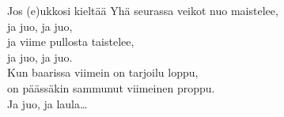 \begin{song}{Jos (e)ukkosi kieltää}
    \showversenumber
	Yhä seurassa veikot nuo maistelee,\\
	ja juo, ja juo,\\
	ja viime pullosta taistelee,\\
	ja juo, ja juo.\\
	Kun baarissa viimein on tarjoilu loppu,\\
	on päässäkin sammunut viimeinen proppu.\\
	Ja juo, ja laula\ldots{}
	
\end{song}
